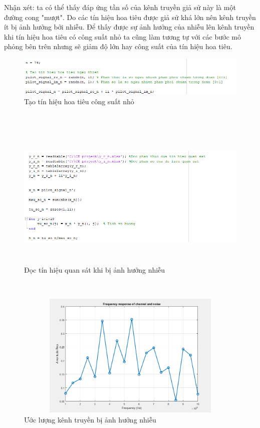 \documentclass{article}
\begin{document}
\newpage
Nhận xét: ta có thể thấy đáp ứng tần số của kênh truyền giả sử này là một đường cong "mượt". Do các tín hiệu hoa tiêu được giả sử khá lớn nên kênh truyền ít bị ảnh hưởng bởi nhiễu. Để thấy được sự ảnh hưởng của nhiễu lên kênh truyền khi tín hiệu hoa tiêu có công suất nhỏ ta cũng làm tương tự với các bước mô phỏng bên trên nhưng sẽ giảm độ lớn hay công suất của tín hiệu hoa tiêu.
\begin{figure}[h!]
    \centering
    \includegraphics[width=14cm]{photo/5.3.3.png}
    \caption{Tạo tín hiệu hoa tiêu công suất nhỏ}
    \label{Hình 21}
\end{figure}\\
\begin{figure}[h!]
    \centering
    \includegraphics[width=14cm, height =7cm]{photo/5.3.4.png}
    \caption{Đọc tín hiệu quan sát khi bị ảnh hưởng nhiễu}
    \label{Hình 22}
\end{figure}\\
\begin{figure}[h!]
    \centering
    \includegraphics[width=14cm, height =6cm]{photo/5.3.5.png}
    \caption{Ước lượng kênh truyền bị ảnh hưởng nhiễu}
    \label{Hình 23}
\end{figure}
\end{document}
